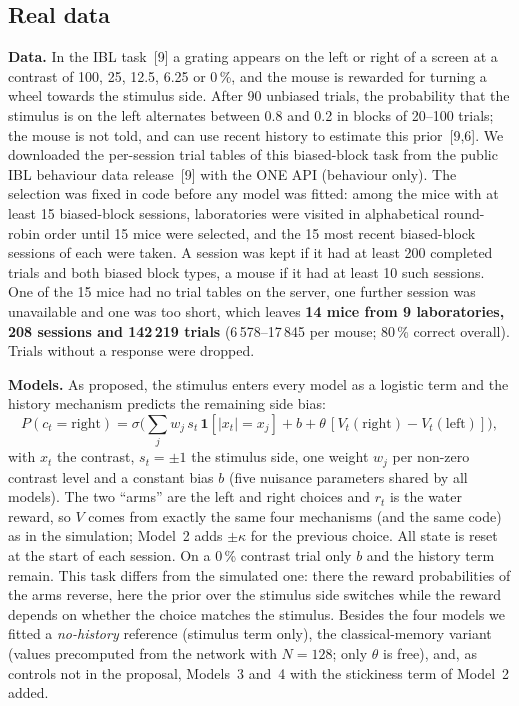 \documentclass[10pt,a4paper]{article}
\begin{document}
\subsection{Real data}
\textbf{Data.} In the IBL task~[9] a grating appears on the left or right of a screen at a contrast of 100, 25,
12.5, 6.25 or 0\,\%, and the mouse is rewarded for turning a wheel towards the stimulus side. After 90 unbiased
trials, the probability that the stimulus is on the left alternates between 0.8 and 0.2 in blocks of 20--100
trials; the mouse is not told, and can use recent history to estimate this prior~[9,6]. We downloaded the
per-session trial tables of this biased-block task from the public IBL behaviour data release~[9] with the ONE
API (behaviour only). The selection was fixed in code before any model was fitted: among the mice with at least
15 biased-block sessions, laboratories were visited in alphabetical round-robin order until 15 mice were
selected, and the 15 most recent biased-block sessions of each were taken. A session was kept if it had at
least 200 completed trials and both biased block types, a mouse if it had at least 10 such sessions. One of the 15
mice had no trial tables on the server, one further session was unavailable and one was too short, which leaves
\textbf{14 mice from 9 laboratories, 208 sessions and 142\,219 trials} (6\,578--17\,845 per mouse; 80\,\% correct
overall). Trials without a response were dropped.

\textbf{Models.} As proposed, the stimulus enters every model as a logistic term and the history mechanism
predicts the remaining side bias:
\begin{equation}
P(c_t=\text{right})=\sigma\Big(\textstyle\sum_j w_j\,s_t\,\mathbf 1[|x_t|=x_j]+b+\theta\,[V_t(\text{right})-V_t(\text{left})]\Big),
\label{eq:mouse}
\end{equation}
with $x_t$ the contrast, $s_t=\pm1$ the stimulus side, one weight $w_j$ per non-zero contrast level and a constant
bias $b$ (five nuisance parameters shared by all models). The two ``arms'' are the left and right choices and
$r_t$ is the water reward, so $V$ comes from exactly the same four mechanisms (and the same code) as in the
simulation; Model~2 adds $\pm\kappa$ for the previous choice. All state is reset at the start of each session. On
a 0\,\% contrast trial only $b$ and the history term remain. This task differs from the simulated one: there the
reward probabilities of the arms reverse, here the prior over the stimulus side switches while the reward depends
on whether the choice matches the stimulus.
Besides the four models we fitted a \emph{no-history} reference (stimulus term only), the classical-memory
variant (values precomputed from the network with $N=128$; only $\theta$ is free), and, as controls not in the
proposal, Models~3 and~4 with the stickiness term of Model~2 added.
\end{document}
